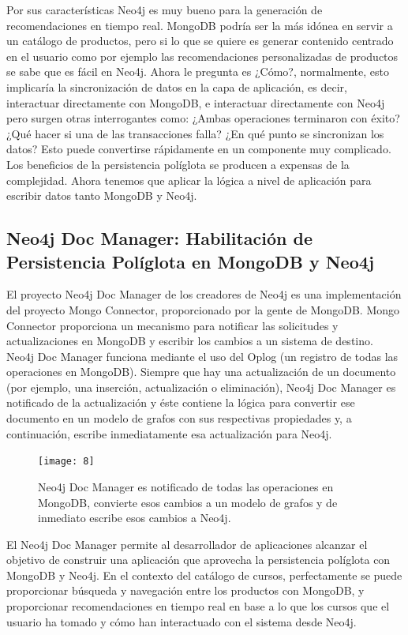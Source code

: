 \documentclass[conference]{IEEEtran}
\begin{document}
Por sus caracter\'isticas Neo4j es muy bueno para la generaci\'on de recomendaciones en tiempo real. MongoDB podr\'ia ser la m\'as id\'onea en servir a un cat\'alogo de productos, pero si lo que se quiere es generar contenido centrado en el usuario como por ejemplo las recomendaciones personalizadas de productos se sabe que es f\'acil en Neo4j. Ahora le pregunta es ¿C\'omo?, normalmente, esto implicar\'ia la sincronizaci\'on de datos en la capa de aplicaci\'on, es decir, interactuar directamente con  MongoDB, e interactuar directamente con Neo4j pero surgen otras interrogantes como: ¿Ambas operaciones terminaron con \'exito? ¿Qu\'e hacer si una de las transacciones falla? ¿En qu\'e punto se sincronizan los datos? Esto puede convertirse r\'apidamente en un componente muy complicado. Los beneficios de la persistencia pol\'iglota se producen a expensas de la complejidad. Ahora tenemos que aplicar la l\'ogica a nivel de aplicaci\'on para escribir datos tanto MongoDB y Neo4j.

\subsection*{Neo4j Doc Manager: Habilitaci\'on de Persistencia Pol\'iglota en MongoDB y Neo4j}

El proyecto Neo4j Doc Manager de los creadores de Neo4j es una implementaci\'on del proyecto Mongo Connector, proporcionado por la gente de MongoDB. Mongo Connector proporciona un mecanismo para notificar las solicitudes y actualizaciones en MongoDB y escribir los cambios a un sistema de destino. Neo4j Doc Manager funciona mediante el uso del Oplog (un registro de todas las operaciones en MongoDB). Siempre que hay una actualizaci\'on de un documento (por ejemplo, una inserci\'on, actualizaci\'on o eliminaci\'on), Neo4j Doc Manager es notificado de la actualizaci\'on y \'este contiene la l\'ogica para convertir ese documento en un modelo de grafos con sus respectivas propiedades y, a continuaci\'on, escribe inmediatamente esa actualizaci\'on para Neo4j.

\begin{figure}[!h]
\centering
\texttt{[image: 8]}
\caption{Neo4j Doc Manager es notificado de todas las operaciones en MongoDB, convierte esos cambios a un modelo de grafos  y de inmediato escribe esos cambios a Neo4j.}
\label{fig8}
\end{figure}

El Neo4j Doc Manager permite al desarrollador de aplicaciones alcanzar el objetivo de construir una aplicaci\'on que aprovecha la persistencia pol\'iglota con MongoDB y Neo4j. En el contexto del cat\'alogo de cursos, perfectamente se puede proporcionar b\'usqueda y navegaci\'on entre los productos con MongoDB, y proporcionar recomendaciones en tiempo real en base a lo que los cursos que el usuario ha tomado y c\'omo han interactuado con el sistema desde Neo4j.
\end{document}
